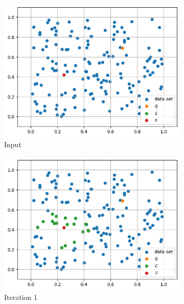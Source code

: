 \begin{figure}[ht]
    \centering
    \hfill
    \begin{subfigure}{0.31\textwidth}
        \includegraphics[width=\textwidth]{images/greedy-search-begin}
        \caption{Input}
        \label{fig:gs-input}
    \end{subfigure}
    \hfill
    \begin{subfigure}{0.31\textwidth}
        \includegraphics[width=\textwidth]{images/greedy-search-1}
        \caption{Iteration 1}
        \label{fig:gs1}
    \end{subfigure}
    \hfill
    \begin{subfigure}{0.31\textwidth}

\end{subfigure}
\end{figure}
